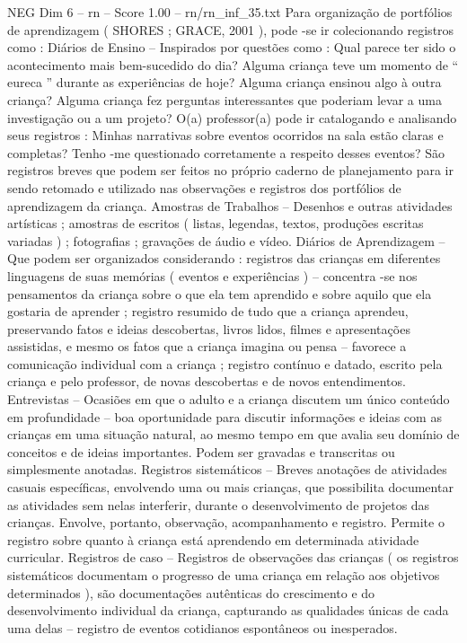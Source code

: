\begin{textsample}{NEG Dim 6 – rn – Score 1.00 – rn/rn\_inf\_35.txt}
Para organização de portfólios de aprendizagem ( SHORES ; GRACE, 2001 ), pode -se ir colecionando registros como : Diários de Ensino – Inspirados por questões como : Qual parece ter sido o acontecimento mais bem-sucedido do dia?
Alguma criança teve um momento de “ eureca ” durante as experiências de hoje?
Alguma criança ensinou algo à outra criança?
Alguma criança fez perguntas interessantes que poderiam levar a uma investigação ou a um projeto?
O(a) professor(a) pode ir catalogando e analisando seus registros : Minhas narrativas sobre eventos ocorridos na sala estão claras e completas?
Tenho -me questionado corretamente a respeito desses eventos?
São registros breves que podem ser feitos no próprio caderno de planejamento para ir sendo retomado e utilizado nas observações e registros dos portfólios de aprendizagem da criança.
Amostras de Trabalhos – Desenhos e outras atividades artísticas ; amostras de escritos ( listas, legendas, textos, produções escritas variadas ) ; fotografias ; gravações de áudio e vídeo.
Diários de Aprendizagem – Que podem ser organizados considerando : registros das crianças em diferentes linguagens de suas memórias ( eventos e experiências ) – concentra -se nos pensamentos da criança sobre o que ela tem aprendido e sobre aquilo que ela gostaria de aprender ; registro resumido de tudo que a criança aprendeu, preservando fatos e ideias descobertas, livros lidos, filmes e apresentações assistidas, e mesmo os fatos que a criança imagina ou pensa – favorece a comunicação individual com a criança ; registro contínuo e datado, escrito pela criança e pelo professor, de novas descobertas e de novos entendimentos.
Entrevistas – Ocasiões em que o adulto e a criança discutem um único conteúdo em profundidade – boa oportunidade para discutir informações e ideias com as crianças em uma situação natural, ao mesmo tempo em que avalia seu domínio de conceitos e de ideias importantes.
Podem ser gravadas e transcritas ou simplesmente anotadas.
Registros sistemáticos – Breves anotações de atividades casuais específicas, envolvendo uma ou mais crianças, que possibilita documentar as atividades sem nelas interferir, durante o desenvolvimento de projetos das crianças.
Envolve, portanto, observação, acompanhamento e registro.
Permite o registro sobre quanto à criança está aprendendo em determinada atividade curricular.
Registros de caso – Registros de observações das crianças ( os registros sistemáticos documentam o progresso de uma criança em relação aos objetivos determinados ), são documentações autênticas do crescimento e do desenvolvimento individual da criança, capturando as qualidades únicas de cada uma delas – registro de eventos cotidianos espontâneos ou inesperados.

\end{textsample}
